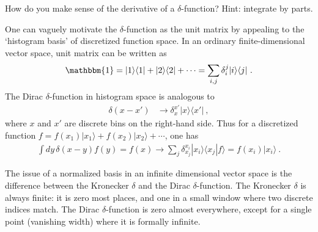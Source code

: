 \documentclass[12pt, oneside]{report}    %
\begin{document}
 \begin{exercise}
 How do you make sense of the derivative of a $\delta$-function? Hint: integrate by parts. 
 \end{exercise}
 



\begin{example}
One can vaguely motivate the $\delta$-function as the unit matrix by appealing to the `histogram basis' of discretized function space. In an ordinary finite-dimensional vector space, unit matrix can be written as
\begin{align}
  \mathbbm{1} = |1\rangle\langle 1 | + |2\rangle\langle 2 | + \cdots
  = \sum_{i,j}\delta_{i}^j|i\rangle\langle j| \ .
\end{align}
The Dirac $\delta$-function in histogram space is analogous to
\begin{align}
  \delta(x-x') &\to \delta_{x}^{x'}|x\rangle\langle x'| \ ,
\end{align}
where $x$ and $x'$ are discrete bins on the right-hand side. Thus for a discretized function $f = f(x_1)|x_1\rangle + f(x_2)|x_2\rangle + \cdots$, one has
\begin{align}
  \int dy\, \delta(x-y) f(y) = f(x) \longrightarrow \sum_j \delta_{x_j}^{x_i}|x_i\rangle\langle x_j| f\rangle  =  f(x_i) |x_i\rangle\ .
\end{align}
\end{example}




\begin{bigidea}
The issue of a normalized basis in an infinite dimensional vector space is the difference between the Kronecker $\delta$ and the Dirac $\delta$-function. The Kronecker $\delta$ is always finite: it is zero most places, and one in a small window where two discrete indices match. The Dirac $\delta$-function is zero almost everywhere, except for a single point (vanishing width) where it is formally infinite.
\end{bigidea}







\end{document}
